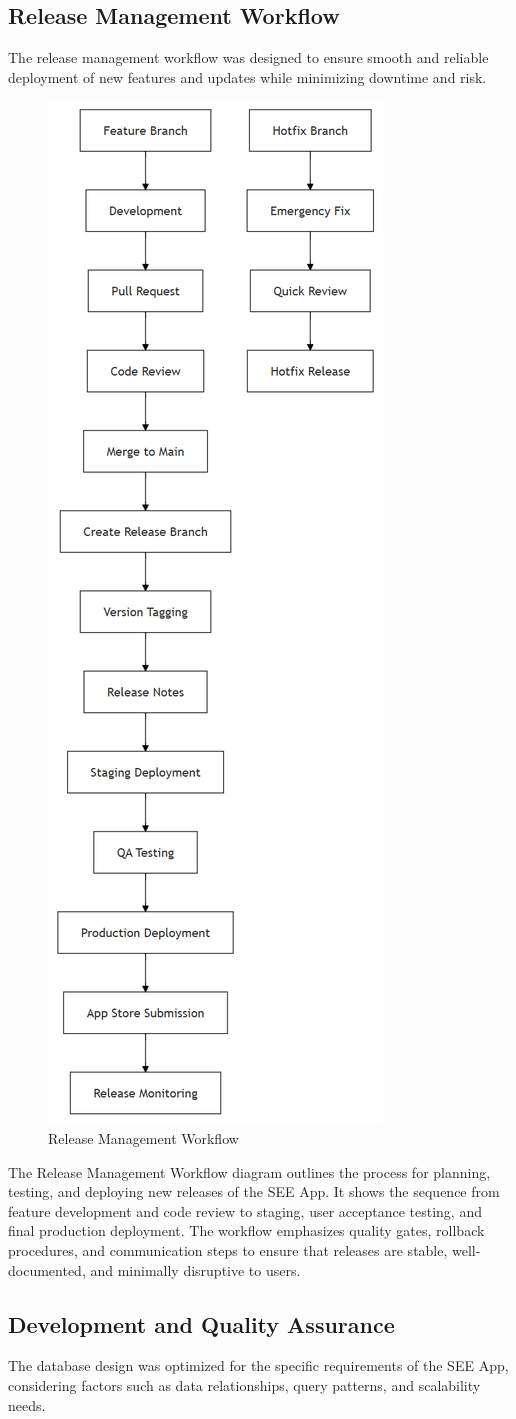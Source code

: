 ﻿\documentclass[12pt,a4paper]{article}
\newcommand{\sectiontitle}[1]{\subsection{#1}}
\begin{document}
\sectiontitle{Release Management Workflow}

The release management workflow was designed to ensure smooth and reliable deployment of new features and updates while minimizing downtime and risk.

\begin{figure}[H]
    \centering
    \includegraphics[height=0.7\textwidth,keepaspectratio]{redrawn_diagrams/Figure8_Release_Workflow.png}
    \caption{Release Management Workflow}
    \label{fig:release-workflow}
\end{figure}
\vspace{0.5em}
The Release Management Workflow diagram outlines the process for planning, testing, and deploying new releases of the SEE App. It shows the sequence from feature development and code review to staging, user acceptance testing, and final production deployment. The workflow emphasizes quality gates, rollback procedures, and communication steps to ensure that releases are stable, well-documented, and minimally disruptive to users.

\sectiontitle{Development and Quality Assurance}

The database design was optimized for the specific requirements of the SEE App, considering factors such as data relationships, query patterns, and scalability needs.
\end{document}
